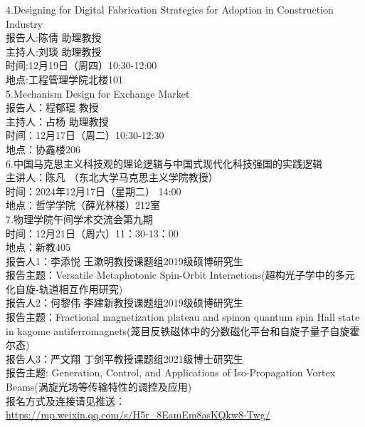 \documentclass[letterpaper, 12pt]{article}
\begin{document}
\begin{multicols}{2}
4.Designing for Digital Fabrication Strategies for Adoption in Construction Industry\\
报告人:陈倩 助理教授\\
主持人:刘琰 助理教授\\
时间:12月19日（周四）10:30-12:00\\
地点:工程管理学院北楼101\\

5.Mechanism Design for Exchange Market\\
报告人：程郁琨 教授\\
主持人：占杨 助理教授\\
时间：12月17日（周二）10:30-12:30\\
地点：协鑫楼206\\

6.中国马克思主义科技观的理论逻辑与中国式现代化科技强国的实践逻辑\\
主讲人：陈凡 （东北大学马克思主义学院教授）\\
时间：2024年12月17日（星期二） 14:00\\
地点：哲学学院（薛光林楼）212室\\

7.物理学院午间学术交流会第九期\\
时间：12月21日（周六）11：30-13：00\\
地点：新教405\\
报告人1：李添悦 王漱明教授课题组2019级硕博研究生\\
报告主题：Versatile Metaphotonic Spin-Orbit Interactions(超构光子学中的多元化自旋-轨道相互作用研究)\\
报告人2：何黎伟 李建新教授课题组2019级硕博研究生\\
报告主题：Fractional magnetization plateau and spinon quantum spin Hall state in kagome antiferromagnets(笼目反铁磁体中的分数磁化平台和自旋子量子自旋霍尔态)\\
报告人3：严文翔 丁剑平教授课题组2021级博士研究生\\
报告主题: Generation, Control, and Applications of Iso-Propagation Vortex Beams(涡旋光场等传输特性的调控及应用)\\
报名方式及连接请见推送：\url{https://mp.weixin.qq.com/s/H5r_8EamEm8asKQkw8-Twg/}\\



\end{multicols}
\end{document}
